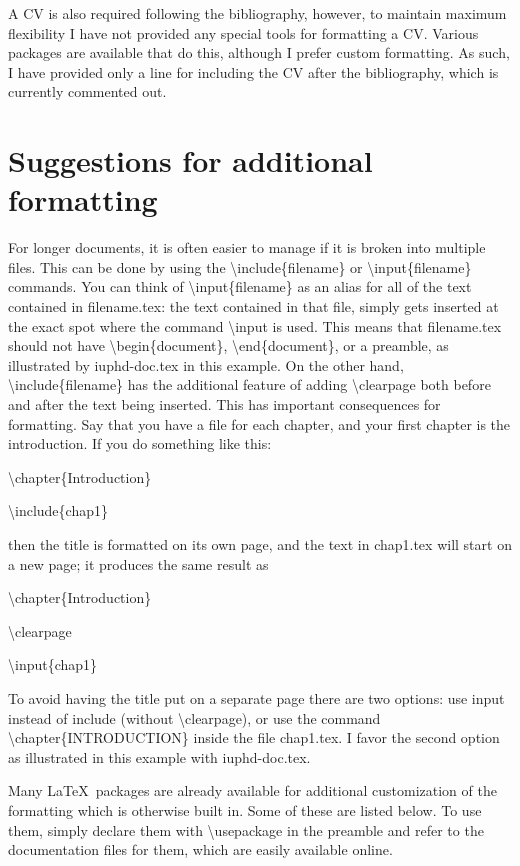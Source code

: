 A CV is also required following the bibliography, however, to maintain maximum flexibility I have not provided any special tools for
formatting a CV.  Various packages are available that do this, although I prefer custom formatting. As such, I have provided only a
line for including the CV after the bibliography, which is currently commented out.



\section{Suggestions for additional formatting}

For longer documents, it is often easier to manage if it is broken into multiple files.  This can be done by using the
\textbackslash include\{filename\} or \textbackslash input\{filename\} commands.  You can think of
\textbackslash input\{filename\} as an alias for all of the text contained in filename.tex: the text contained in that file,
simply gets inserted at the exact spot where the command \textbackslash input is used.  This means that filename.tex should not have
\textbackslash begin\{document\}, \textbackslash end\{document\}, or a preamble, as illustrated by iuphd-doc.tex in this example.
On the other hand, \textbackslash include\{filename\} has the additional feature of adding \textbackslash clearpage both before and after
the text being inserted.  This has important consequences for formatting.  Say that you have a file for each chapter,
and your first chapter is the introduction.  If you do something like this:
\medskip

\textbackslash chapter\{Introduction\}

\textbackslash include\{chap1\}
\medskip

\noindent then the title is formatted on its own page, and the text in chap1.tex will start on a new page; it produces
the same result as
\medskip

\textbackslash chapter\{Introduction\}

\textbackslash clearpage

\textbackslash input\{chap1\}
\medskip

\noindent To avoid having the title put on a separate page there are two options: use input instead of include
(without \textbackslash clearpage), or use the command \textbackslash chapter\{INTRODUCTION\} inside the file chap1.tex.
I favor the second option as illustrated in this example with iuphd-doc.tex.

Many \LaTeX \ packages are already available for additional customization of the formatting which is otherwise built in.
Some of these are listed below.  To use them, simply declare them with \textbackslash usepackage in the preamble
and refer to the documentation files for them, which are easily available online.

